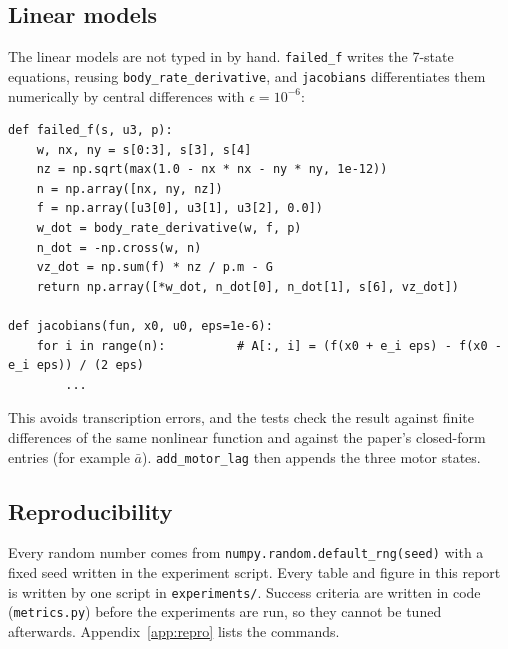 \subsection{Linear models}
The linear models are not typed in by hand. \texttt{failed\_f} writes the 7-state equations, reusing \texttt{body\_rate\_derivative}, and \texttt{jacobians} differentiates them numerically by central differences with $\epsilon = 10^{-6}$:
\begin{lstlisting}
def failed_f(s, u3, p):
    w, nx, ny = s[0:3], s[3], s[4]
    nz = np.sqrt(max(1.0 - nx * nx - ny * ny, 1e-12))
    n = np.array([nx, ny, nz])
    f = np.array([u3[0], u3[1], u3[2], 0.0])
    w_dot = body_rate_derivative(w, f, p)
    n_dot = -np.cross(w, n)
    vz_dot = np.sum(f) * nz / p.m - G
    return np.array([*w_dot, n_dot[0], n_dot[1], s[6], vz_dot])

def jacobians(fun, x0, u0, eps=1e-6):
    for i in range(n):          # A[:, i] = (f(x0 + e_i eps) - f(x0 - e_i eps)) / (2 eps)
        ...
\end{lstlisting}
This avoids transcription errors, and the tests check the result against finite differences of the same nonlinear function and against the paper's closed-form entries (for example $\bar a$). \texttt{add\_motor\_lag} then appends the three motor states.

\subsection{Reproducibility}
Every random number comes from \texttt{numpy.random.default\_rng(seed)} with a fixed seed written in the experiment script. Every table and figure in this report is written by one script in \texttt{experiments/}. Success criteria are written in code (\texttt{metrics.py}) before the experiments are run, so they cannot be tuned afterwards. Appendix~\ref{app:repro} lists the commands.
